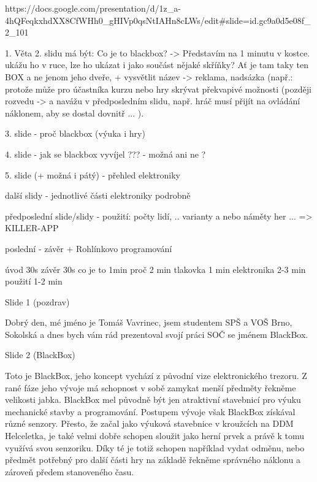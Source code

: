 https://docs.google.com/presentation/d/1z_a-4hQFeqkxhdXX8CfWHh0_gHIVp0qsNtIAHn8cLWs/edit#slide=id.gc9a0d5e08f_2_101

1. Věta 2. slidu má být: Co je to blackbox? -> Představím na 1 minutu v kostce.  
ukážu ho v ruce, lze ho ukázat i jako součást nějaké skříňky? Ať je tam taky ten BOX  
a ne jenom jeho dveře, 
+ vysvětlit název -> reklama, nadsázka (např.: protože může pro účastníka kurzu nebo 
hry skrývat překvapivé možnosti (později rozvedu -> a navážu v předposledním slidu, 
např. hráč musí přijít na ovládání náklonem, aby se dostal dovnitř ... ).


3. slide - proč blackbox (výuka i hry)

4. slide - jak se blackbox vyvíjel ??? - možná ani ne ? 

5. slide (+ možná i pátý) - přehled elektroniky 

další slidy - jednotlivé části elektroniky podrobně %


předposlední slide/slidy - použití: počty lidí, .. varianty a nebo náměty her ... => KILLER-APP

poslední - závěr + Rohlínkovo programování  

úvod 30s závěr 30s 
co je to 1min 
proč 2 min 
tlakovka 1 min 
elektronika 2-3 min 
použití 1-2 min 




Slide 1 (pozdrav)

Dobrý den, mé jméno je Tomáš Vavrinec, jsem studentem SPŠ a VOŠ Brno, Sokolská
a dnes bych vám rád prezentoval svojí práci SOČ se jménem BlackBox.


Slide 2 (BlackBox)

Toto je BlackBox, jeho koncept vychází z původní vize elektronického trezoru.
Z rané fáze jeho vývoje má schopnost v sobě zamykat menší předměty řekněme velikosti jabka. %
BlackBox mel původně být jen atraktivní stavebnicí pro výuku mechanické stavby a programování. 
Postupem vývoje však BlackBox získával různé senzory. 
Přesto, že začal jako výuková stavebnice 
v kroužcích na DDM Helceletka, je také velmi dobře 
schopen sloužit jako herní prvek a právě k tomu využívá svou senzoriku. 
Díky té je totiž schopen například vydat odměnu, nebo
předmět potřebný pro další části hry na základě řekněme správného náklonu 
a zároveň předem stanoveného času.

